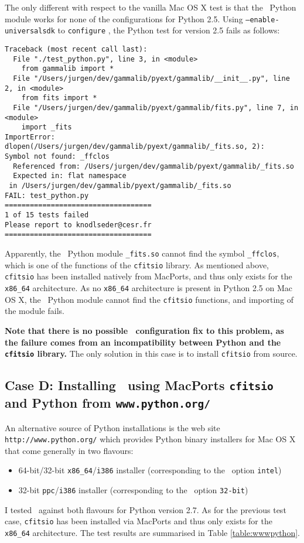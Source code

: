 \documentclass{article}[12pt,a4]
\begin{document}
The only different with respect to the vanilla Mac OS X test is that the \this\ Python module
works for none of the configurations for Python 2.5.
Using {\tt --enable-universalsdk} to {\tt configure} \this, the Python test for version 2.5 fails
as follows:
{\small\begin{verbatim}
Traceback (most recent call last):
  File "./test_python.py", line 3, in <module>
    from gammalib import *
  File "/Users/jurgen/dev/gammalib/pyext/gammalib/__init__.py", line 2, in <module>
    from fits import *
  File "/Users/jurgen/dev/gammalib/pyext/gammalib/fits.py", line 7, in <module>
    import _fits
ImportError: dlopen(/Users/jurgen/dev/gammalib/pyext/gammalib/_fits.so, 2): 
Symbol not found: _ffclos
  Referenced from: /Users/jurgen/dev/gammalib/pyext/gammalib/_fits.so
  Expected in: flat namespace
 in /Users/jurgen/dev/gammalib/pyext/gammalib/_fits.so
FAIL: test_python.py
===================================
1 of 15 tests failed
Please report to knodlseder@cesr.fr
===================================
\end{verbatim}}
Apparently, the \this\ Python module {\tt \_fits.so} cannot find the symbol {\tt \_ffclos}, which is
one of the functions of the {\tt cfitsio} library.
As mentioned above, {\tt cfitsio} has been installed natively from MacPorts, and thus only exists
for the {\tt x86\_64} architecture.
As no {\tt x86\_64} architecture is present in Python 2.5 on Mac OS X, the \this\ Python module
cannot find the {\tt cfitsio} functions, and importing of the module fails.

{\bf Note that there is no possible \this\ configuration fix to this problem, as the failure comes from
an incompatibility between Python and the {\tt cfitsio} library.}
The only solution in this case is to install {\tt cfitsio} from source.


\subsection{Case D: Installing \this\ using MacPorts {\tt cfitsio} and Python from {\tt www.python.org/}}

An alternative source of Python installations is the web site
{\tt http://www.python.org/}
which provides Python binary installers for Mac OS X that come generally
in two flavours:
\begin{itemize}
\item 64-bit/32-bit {\tt x86\_64}/{\tt i386} installer (corresponding to the \this\ option {\tt intel})
\item 32-bit {\tt ppc}/{\tt i386} installer (corresponding to the \this\ option {\tt 32-bit})
\end{itemize}
I tested \this\ against both flavours for Python version 2.7.
As for the previous test case, {\tt cfitsio} has been installed via MacPorts and thus only exists 
for the {\tt x86\_64} architecture.
The test results are summarised in Table \ref{table:wwwpython}.
\end{document}
